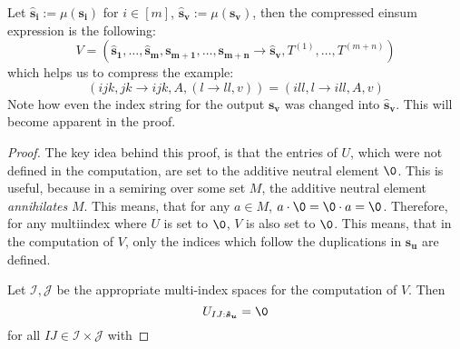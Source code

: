 \begin{theorem}
    Let $\bm{\hat{s}_i} := \mu(\bm{s_i})$ for $i \in [m]$, $\bm{\hat{s}_v} := \mu(\bm{s_v})$, then the compressed einsum expression is the following:
    $$V = (\bm{\hat{s}_1},\dots,\bm{\hat{s}_m}, \bm{s_{m + 1}}, \dots, \bm{s_{m + n}} \rightarrow \bm{\hat{s}_v}, T^{(1)},\dots,T^{(m + n)})$$
    which helps us to compress the example:
    $$(ijk, jk \rightarrow ijk, A, (l \rightarrow ll, v)) = (ill, l \rightarrow ill, A, v)$$
    Note how even the index string for the output $\bm{s_v}$ was changed into $\bm{\hat{s}_v}$.
    This will become apparent in the proof.

\end{theorem}
\begin{proof}
    The key idea behind this proof, is that the entries of $U$, which were not defined in the computation, are set to the additive neutral element $\0$.
    This is useful, because in a semiring over some set $M$, the additive neutral element \textit{annihilates} $M$.
    This means, that for any $a \in M$, $a \cdot \0 = \0 \cdot a = \0$.
    Therefore, for any multiindex where $U$ is set to $\0$, $V$ is also set to $\0$.
    This means, that in the computation of $V$, only the indices which follow the duplications in $\bm{s_u}$ are defined.

    Let $\mathcal{I}, \mathcal{J}$ be the appropriate multi-index spaces for the computation of $V$. Then
    $$U_{IJ:\bm{\hat{s}_u}} = \0$$
    for all $IJ \in \mathcal{I} \times \mathcal{J}$ with
\end{proof}

